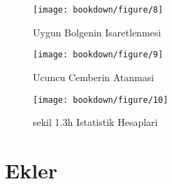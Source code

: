 \documentclass[]{book}
\begin{document}
\begin{figure}

{\centering \texttt{[image: bookdown/figure/8]} 

}

\caption{ Uygun Bolgenin Isaretlenmesi}\label{fig:pressure8}
\end{figure}

\begin{figure}

{\centering \texttt{[image: bookdown/figure/9]} 

}

\caption{ Ucuncu Cemberin Atanmasi}\label{fig:pressure9}
\end{figure}

\begin{figure}

{\centering \texttt{[image: bookdown/figure/10]} 

}

\caption{sekil 1.3h Istatistik Hesaplari}\label{fig:pressure10}
\end{figure}

\hypertarget{ekler}{%
\chapter{Ekler}\label{ekler}}
\end{document}
